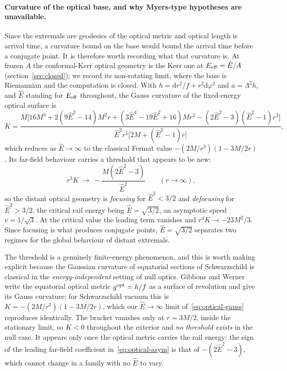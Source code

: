 \documentclass[12pt]{iopart}
\theoremstyle{plain}
\theoremstyle{definition}
\theoremstyle{remark}
\newcommand{\Ehat}{\hat E}
\newcommand{\dd}{\mathrm{d}}
\begin{document}
\paragraph{Curvature of the optical base, and why Myers-type hypotheses are
unavailable.} Since the extremals are geodesics of the optical metric and optical
length is arrival time, a curvature bound on the base would bound the arrival
time before a conjugate point. It is therefore worth recording what that
curvature is. At frozen $A$ the conformal-Kerr optical geometry is the Kerr one
at $E_{\rm eff}=\Ehat/A$ (section~\ref{sec:closed}); we record its
non-rotating limit, where the base is Riemannian and the computation is closed.
With $h=\dd r^2/f+r^2\dd\varphi^2$ and $a=\Lambda^2h$, and $\Ehat$ standing for
$E_{\rm eff}$ throughout, the Gauss curvature of the fixed-energy optical
surface is
\begin{equation}
    K=\frac{M\big[16M^3+2(9\Ehat^2\!-\!14)M^2r
      +(3\Ehat^4\!-\!19\Ehat^2\!+\!16)Mr^2
      -(2\Ehat^2\!-\!3)(\Ehat^2\!-\!1)r^3\big]}
      {\Ehat^2r^5\big[2M+(\Ehat^2-1)r\big]} ,
    \label{eq:optical-gauss}
\end{equation}
which reduces as $\Ehat\to\infty$ to the classical Fermat value
$-(2M/r^3)(1-3M/2r)$. Its far-field behaviour carries a threshold that appears to
be new:
\begin{equation}
    r^3K\ \longrightarrow\ -\frac{M(2\Ehat^2-3)}{\Ehat^2}
    \qquad (r\to\infty),
    \label{eq:optical-asym}
\end{equation}
so the distant optical geometry is \emph{focusing} for $\Ehat^2<3/2$ and
\emph{defocusing} for $\Ehat^2>3/2$, the critical rail energy being
$\Ehat=\sqrt{3/2}$, an asymptotic speed $v=1/\sqrt3$. At the critical value the
leading term vanishes and $r^4K\to-23M^2/3$. Since focusing is what produces
conjugate points, $\Ehat=\sqrt{3/2}$ separates two regimes for the global
behaviour of distant extremals.

The threshold is a genuinely finite-energy phenomenon, and this is worth making
explicit because the Gaussian curvature of equatorial sections of Schwarzschild is
classical in the \emph{energy-independent} setting of null optics. Gibbons and
Werner \cite[Eqs.~(7)--(8)]{GibbonsWerner2008} write the equatorial optical
metric $g^{\rm opt}=h/f$ as a surface of revolution and give its Gauss curvature;
for Schwarzschild vacuum this is $K=-(2M/r^3)(1-3M/2r)$, which our
$\Ehat\to\infty$ limit of~\eqref{eq:optical-gauss} reproduces identically. The
bracket vanishes only at $r=3M/2$, inside the stationary limit, so $K<0$
throughout the exterior and \emph{no threshold exists} in the null case. It appears only once the optical metric carries the rail
energy: the sign of the leading far-field coefficient
in~\eqref{eq:optical-asym} is that of $-(2\Ehat^2-3)$, which cannot change in a
family with no $\Ehat$ to vary.
\end{document}
